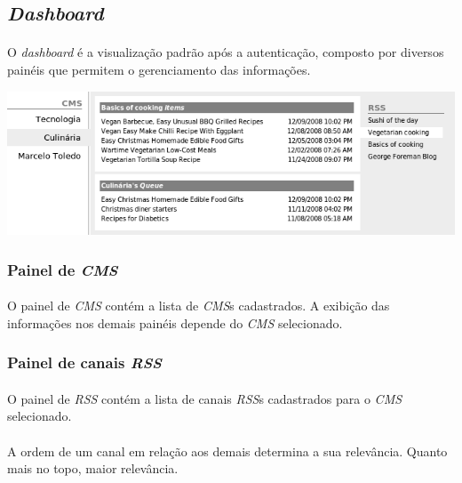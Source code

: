 \documentclass[a4paper,12pt]{article}
\def\cms{\emph{CMS}}
\def\rss{\emph{RSS}}
\begin{document}
\subsection{\emph{Dashboard}}

\paragraph{}
O \emph{dashboard} é a visualização padrão após a autenticação, composto por
diversos painéis que permitem o gerenciamento das informações. 

\begin{center}
\includegraphics[scale=0.5]{dashboard.png}
\end{center}

\subsubsection{Painel de \cms{}}

\paragraph{}
O painel de \cms{} contém a lista de \cms{}s cadastrados. A exibição das informações nos demais painéis depende do \cms{} selecionado.

\subsubsection{Painel de canais \rss{}}

\paragraph{}
O painel de \rss{} contém a lista de canais \rss{}s cadastrados para o \cms{}
selecionado.

\paragraph{}
A ordem de um canal em relação aos demais determina a sua relevância. Quanto
mais no topo, maior relevância.
\end{document}
